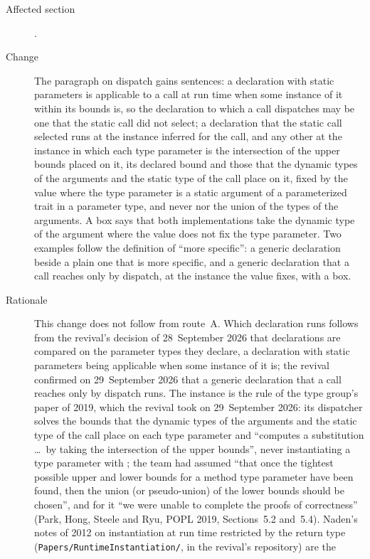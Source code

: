 \begin{description}
\item[Affected section] .
\item[Change] The paragraph on dispatch gains sentences: a declaration with
static parameters is applicable to a call at run time when some instance of it
within its bounds is, so the declaration to which a call dispatches may be one
that the static call did not select; a declaration that the static call
selected runs at the instance inferred for the call, and any other at the
instance in which each type parameter is the intersection of the upper bounds
placed on it, its declared bound and those that the dynamic types of the
arguments and the static type of the call place on it, fixed by the value where
the type parameter is a static argument of a parameterized trait in a parameter
type, and never  nor the union of the types of the arguments.
A box says that both implementations take the dynamic type of the argument where
the value does not fix the type parameter.
Two examples follow the definition of ``more specific'': a generic declaration
beside a plain one that is more specific, and a generic declaration that a call
reaches only by dispatch, at the instance the value fixes, with a box.
\item[Rationale] This change does not follow from route~A.
Which declaration runs follows from the revival's decision of 28~September 2026
that declarations are compared on the parameter types they declare, a
declaration with static parameters being applicable when some instance of it is;
the revival confirmed on 29~September 2026 that a generic declaration that a
call reaches only by dispatch runs.
The instance is the rule of the type group's paper of 2019, which the revival
took on 29~September 2026: its dispatcher solves the bounds that the dynamic
types of the arguments and the static type of the call place on each type
parameter and ``computes a substitution \ldots\ by taking the intersection of
the upper bounds'', never instantiating a type parameter with ;
the team had assumed ``that once the tightest possible upper and lower bounds
for a method type parameter have been found, then the union (or pseudo-union) of
the lower bounds should be chosen'', and for it ``we were unable to complete the
proofs of correctness'' (Park, Hong, Steele and Ryu, POPL 2019, Sections~5.2
and~5.4).
Naden's notes of 2012 on instantiation at run time restricted by the return type
(\nolinkurl{Papers/RuntimeInstantiation/}, in the revival's repository) are the

\end{description}
